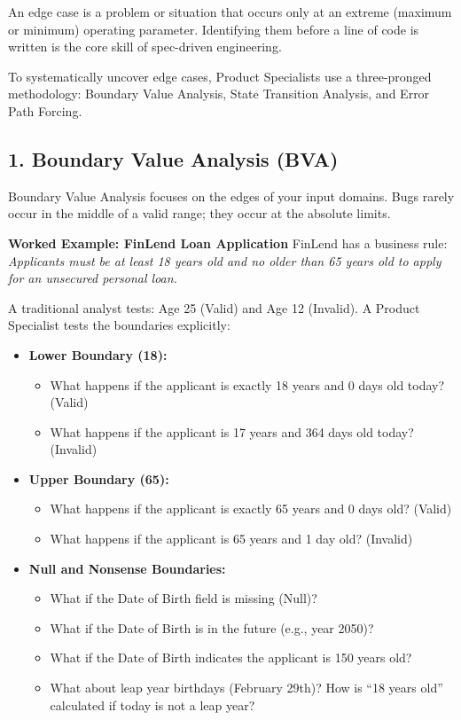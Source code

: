 An edge case is a problem or situation that occurs only at an extreme
(maximum or minimum) operating parameter. Identifying them before a line
of code is written is the core skill of spec-driven engineering.

To systematically uncover edge cases, Product Specialists use a
three-pronged methodology: Boundary Value Analysis, State Transition
Analysis, and Error Path Forcing.

\subsection{1. Boundary Value Analysis
(BVA)}\label{boundary-value-analysis-bva}

Boundary Value Analysis focuses on the edges of your input domains. Bugs
rarely occur in the middle of a valid range; they occur at the absolute
limits.

\textbf{Worked Example: FinLend Loan Application} FinLend has a business
rule: \emph{Applicants must be at least 18 years old and no older than
65 years old to apply for an unsecured personal loan.}

A traditional analyst tests: Age 25 (Valid) and Age 12 (Invalid). A
Product Specialist tests the boundaries explicitly:

\begin{itemize}
\tightlist
\item
  \textbf{Lower Boundary (18):}

  \begin{itemize}
  \tightlist
  \item
    What happens if the applicant is exactly 18 years and 0 days old
    today? (Valid)
  \item
    What happens if the applicant is 17 years and 364 days old today?
    (Invalid)
  \end{itemize}
\item
  \textbf{Upper Boundary (65):}

  \begin{itemize}
  \tightlist
  \item
    What happens if the applicant is exactly 65 years and 0 days old?
    (Valid)
  \item
    What happens if the applicant is 65 years and 1 day old? (Invalid)
  \end{itemize}
\item
  \textbf{Null and Nonsense Boundaries:}

  \begin{itemize}
  \tightlist
  \item
    What if the Date of Birth field is missing (Null)?
  \item
    What if the Date of Birth is in the future (e.g., year 2050)?
  \item
    What if the Date of Birth indicates the applicant is 150 years old?
  \item
    What about leap year birthdays (February 29th)? How is ``18 years
    old'' calculated if today is not a leap year?
  \end{itemize}
\end{itemize}

